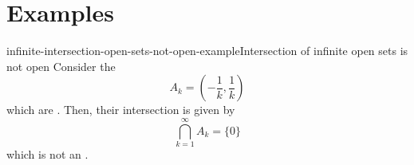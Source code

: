 \documentclass[preview]{standalone}
\begin{document}
\genpage

\section{Examples}


\begin{snippetexample}{infinite-intersection-open-sets-not-open-example}{Intersection of infinite open sets is not open}
    Consider the \set[sets]
    \[
        A_k = \left(-\frac{1}{k}, \frac{1}{k}\right)
    \]
    which are \msopenset[open].
    Then, their intersection is given by
    \[
        \bigcap_{k=1}^\infty A_k = \{0\}
    \]
    which is not an \interiorpoint.
\end{snippetexample}
\end{document}
